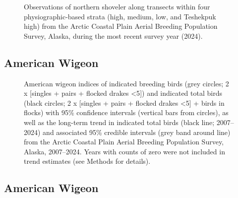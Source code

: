 \documentclass[
]{article}
\begin{document}
\begin{figure}


\caption{\label{fig-NSHOmap}Observations of northern shoveler along
transects within four physiographic-based strata (high, medium, low, and
Teshekpuk high) from the Arctic Coastal Plain Aerial Breeding Population
Survey, Alaska, during the most recent survey year (2024).}

\end{figure}%

\newpage{}

\subsection*{American Wigeon}\label{american-wigeon}

\begin{figure}


\caption{\label{fig-AMWI}American wigeon indices of indicated breeding
birds (grey circles; 2 x {[}singles + pairs + flocked drakes
\textless5{]}) and indicated total birds (black circles; 2 x {[}singles
+ pairs + flocked drakes \textless5{]} + birds in flocks) with 95\%
confidence intervals (vertical bars from circles), as well as the
long-term trend in indicated total birds (black line; 2007--2024) and
associated 95\% credible intervals (grey band around line) from the
Arctic Coastal Plain Aerial Breeding Population Survey, Alaska,
2007--2024. Years with counts of zero were not included in trend
estimates (see Methods for details).}

\end{figure}%

\newpage{}

\subsection*{American Wigeon}\label{american-wigeon-1}

\begingroup\fontsize{10}{12}\selectfont
\end{document}

